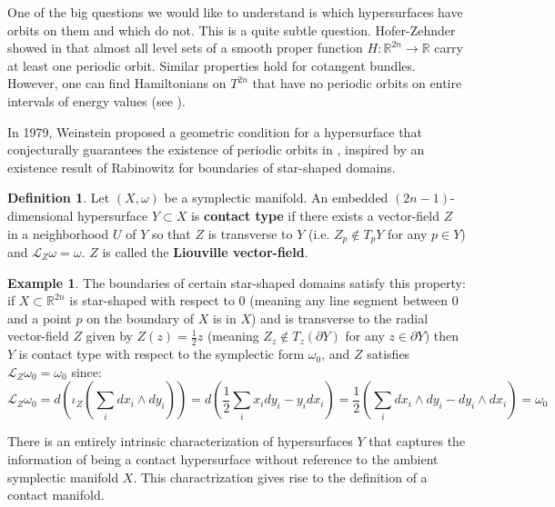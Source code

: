 \documentclass[12pt]{article}
\theoremstyle{definition}
\newtheorem{definition}[theorem]{Definition}
\newtheorem{example}[theorem]{Example}
\numberwithin{equation}{section}
\newcommand{\R}{{\mathbb R}}
\begin{document}
One of the big questions we would like to understand is which hypersurfaces have orbits on them and which do not. This is a quite subtle question. Hofer-Zehnder showed in \cite{hoferzehnder1987} that almost all level sets of a smooth proper function $H:\R^{2n} \to \R$ carry at least one periodic orbit. Similar properties hold for cotangent bundles. However, one can find Hamiltonians on $T^{2n}$ that have no periodic orbits on entire intervals of energy values (see \cite{herman1991}). 

In 1979, Weinstein proposed a geometric condition for a hypersurface that conjecturally guarantees the existence of periodic orbits in \cite{weinstein1979}, inspired by an existence result of Rabinowitz for boundaries of star-shaped domains.

\begin{definition} Let $(X,\omega)$ be a symplectic manifold. An embedded $(2n-1)$-dimensional hypersurface $Y \subset X$ is {\bf contact type} if there exists a vector-field $Z$ in a neighborhood $U$ of $Y$ so that $Z$ is transverse to $Y$ (i.e. $Z_p \not\in T_pY$ for any $p \in Y$) and $\mathcal{L}_Z\omega = \omega$. $Z$ is called the {\bf Liouville vector-field}.
\end{definition}

\begin{example} The boundaries of certain star-shaped domains satisfy this property: if $X \subset \R^{2n}$ is star-shaped with respect to $0$ (meaning any line segment between $0$ and a point $p$ on the boundary of $X$ is in $X$) and is transverse to the radial vector-field $Z$ given by $Z(z) = \frac{1}{2}z$ (meaning $Z_z \not\in T_z(\partial Y)$ for any $z \in \partial Y$) then $Y$ is contact type with respect to the symplectic form $\omega_0$, and $Z$ satisfies $\mathcal{L}_Z\omega_0 = \omega_0$ since:
\[
\mathcal{L}_Z\omega_0 = d(\iota_Z(\sum_i dx_i \wedge dy_i)) = d(\frac{1}{2}\sum_i x_i dy_i - y_i dx_i) = \frac{1}{2}(\sum_i dx_i \wedge dy_i - dy_i \wedge dx_i) = \omega_0
\]
\end{example}

There is an entirely intrinsic characterization of hypersurfaces $Y$ that captures the information of being a contact hypersurface without reference to the ambient symplectic manifold $X$. This charactrization gives rise to the definition of a contact manifold.
\end{document}

